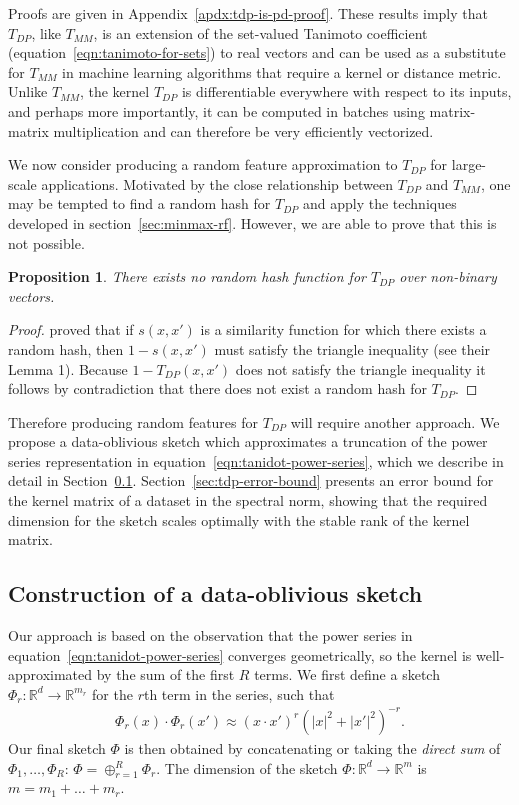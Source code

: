 \documentclass{article}
\theoremstyle{plain}
\newtheorem{proposition}[theorem]{Proposition}
\theoremstyle{definition}
\theoremstyle{remark}
\newcommand{\eq}[1]{\begin{align*}#1\end{align*}}
\newcommand{\R}{\mathbb{R}}
\begin{document}
Proofs are given in Appendix~\ref{apdx:tdp-is-pd-proof}. These results imply that $T_{DP}$, like $T_{MM}$, is an extension of the set-valued Tanimoto coefficient (equation~\ref{eqn:tanimoto-for-sets})
to real vectors and can be used as a substitute for $T_{MM}$ in machine learning algorithms that require a kernel or distance metric. Unlike $T_{MM}$, the kernel $T_{DP}$
 is differentiable everywhere with respect to its inputs,
 and perhaps more importantly, it can be computed in batches using matrix-matrix multiplication and can therefore be very efficiently vectorized.

We now consider producing a random feature approximation to $T_{DP}$ for large-scale applications.
Motivated by the close relationship between $T_{DP}$ and $T_{MM}$,
one may be tempted to find a random hash for $T_{DP}$
and apply the techniques developed in section~\ref{sec:minmax-rf}.
However, we are able to prove that this is not possible.
\begin{proposition}
    There exists no random hash function for $T_{DP}$ over non-binary vectors.
\end{proposition}
\begin{proof}
    \citet{charikar2002similarity} proved that if $s(x,x')$ is a similarity function
    for which there exists a random hash,
    then $1-s(x,x')$ must satisfy the triangle inequality (see their Lemma 1).
    Because $1-T_{DP}(x,x')$ does not satisfy the triangle inequality it follows by contradiction
    that there does not exist a random hash for $T_{DP}$.
\end{proof}

Therefore producing random features for $T_{DP}$ will require another approach.
We propose a data-oblivious sketch which approximates a truncation of the power series representation in equation~\ref{eqn:tanidot-power-series},
which we describe in detail in Section~\ref{sec:tdp-rf}.
Section~\ref{sec:tdp-error-bound} presents an error bound for the kernel matrix of a dataset in the spectral norm,
showing that the required dimension for the sketch scales optimally with the stable rank of the kernel matrix.

\subsection{Construction of a data-oblivious sketch}
\label{sec:tdp-rf}

Our approach is based on the observation that the power series in equation~\ref{eqn:tanidot-power-series} converges geometrically, so the kernel is well-approximated by the sum of the first $R$ terms. We first define a sketch $\Phi_r: \R^d \to \R^{m_r}$ for the $r$th term in the series, such that 
\eq{
\Phi_r(x)\cdot \Phi_r(x') \approx (x\cdot x')^r (|x|^2 + |x'|^2)^{-r}.
}
Our final sketch $\Phi$ is then obtained by concatenating or taking the \emph{direct sum} of $\Phi_1,\dots,\Phi_R$: $\Phi = \oplus_{r=1}^R \Phi_r$. The dimension of the sketch $\Phi: \R^d \to \R^m$ is $m=m_1+\dots+m_r$.
\end{document}
